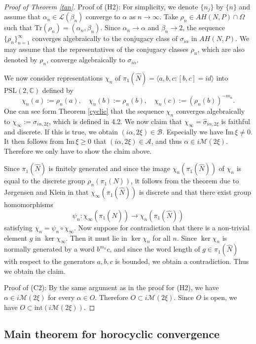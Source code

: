 \documentclass[12pt]{article}
\theoremstyle{plain}
\theoremstyle{definition}
\theoremstyle{remark}
\newcommand{\M}{\mathcal M}
\newcommand{\B}{\mathcal B}
\newcommand{\LL}{\mathcal L}
\newcommand{\A}{\mathcal A}
\newcommand{\hN}{{\hat N}}
\newcommand{\alp}{\alpha}
\newcommand{\fty}{\infty}
\newcommand{\la}{\langle}
\newcommand{\ra}{\rangle}
\newcommand{\Tr}{{\mathrm{Tr}}}
\newcommand{\inte}{\mathrm{int}}
\newcommand{\id}{\mathit{id}}
\newcommand{\im}{\mathrm{Im}}
\newcommand{\psl}{{\mathrm{PSL}}(2,\mathbb C)}
\begin{document}
\begin{proof}[Proof of Theorem \ref{tan}]
\bigskip

Proof of (H2):  
For simplicity, we denote $\{n_j\}$ by $\{n\}$ and assume that 
$\alpha_{n} \in \LL(\beta_{n})$ converge to $\alpha$ as $n \to \fty$. 
Take $\rho_n \in AH(N,P) \cap \Omega$ such that $\Tr(\rho_n)=(\alp_n,\beta_n)$. 
Since $\alp_n \to \alp$ and $\beta_n \to 2$, 
the sequence $\{\rho_n\}_{n=1}^\fty$ 
converges algebraically to the conjugacy class of $\sigma_{i\alp}$ in $AH(N,P)$. 
We may assume that the representatives of the conjugacy classes 
$\rho_n$, which are also denoted by $\rho_n$, converge algebraically to $\sigma_{i\alp}$.  

We now consider representations $\chi_n$ of $\pi_1(\hN)=\la a,b,c : [b,c]=\id \ra$ into 
$\psl $ defined by 
$$
\chi_n(a):=\rho_n(a), \quad 
\chi_n(b):=\rho_n(b), \quad 
\chi_n(c):=(\rho_n(b))^{-m_{n}}. 
$$
One can see form Theorem \ref{cyclic} that the sequence $\chi_n$ 
converges algebraically to $\chi_\fty:=\hat \sigma_{i\alp,2\xi}$, 
which is defined in 4.2.  
We now claim that $\chi_\fty=\hat \sigma_{i\alp,2\xi}$ is faithful and discrete. 
If this is true, we obtain $(i\alp,2\xi) \in \B$.  
Especially we have $\im\,\xi \ne 0$. 
It then follows from $\im\,\xi \ge 0$  that $(i\alp,2\xi) \in \A$, and thus $\alp \in i \M({2\xi})$. 
Therefore we only have to show the claim above. 

Since $\pi_1(\hN)$ is finitely generated and 
since the image $\chi_n(\pi_1(\hN))$ of $\chi_n$  is equal to the discrete group $\rho_n(\pi_1(N))$, 
it follows from the theorem due to J{\o}rgensen and Klein in \cite{JK} 
that $\chi_\fty(\pi_1(\hN))$ is discrete and that 
there exist group homomorphisms 
$$
\psi_n:\chi_\fty(\pi_1(\hN)) \to \chi_n(\pi_1(\hN))
$$ 
satisfying  $\chi_n=\psi_n  \circ \chi_\fty$. 
Now suppose for contradiction that there is a non-trivial element $g$ in $\ker \chi_\fty$. 
Then it must lie  in $\ker \chi_n$ for all $n$. 
Since $\ker \chi_n$ is normally generated by a word $ b^{m_n}c$,  
and since the word length of 
$g \in \pi_1(\hN)$ with respect to the generators $a,b,c$ is bounded, 
 we obtain a contradiction. Thus we obtain the claim. 


\bigskip

Proof of (C2):  
By the same argument as in the proof for (H2), 
we have $\alp \in i\M({2\xi})$ for every $\alp \in O$. 
Therefore $O \subset  i\M({2\xi})$. 
Since $O$ is open, we have 
$O \subset  \inte(i\M({2\xi}))$. 
\end{proof}


\subsection{Main theorem for horocyclic convergence}
\end{document}
